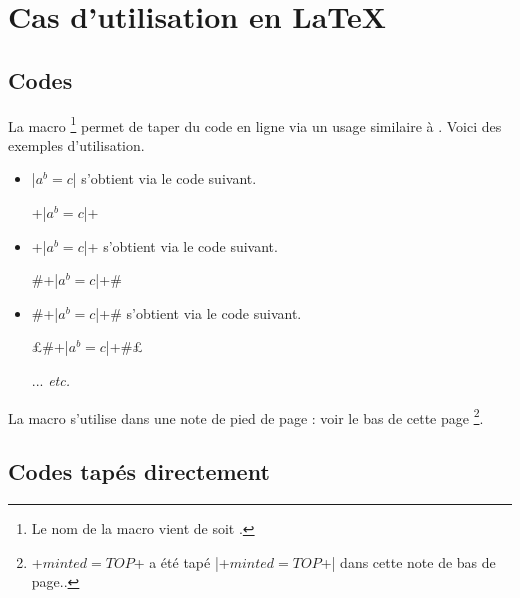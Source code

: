\documentclass[10pt, a4paper]{article}
\begin{document}
\section{Cas d'utilisation en \LaTeX}

\subsection{Codes } \label{bdoc-listing-inline}

La macro 
\footnote{
	Le nom de la macro  vient de  soit .
}
permet de taper du code en ligne via un usage similaire à .
Voici des exemples d'utilisation.
\begin{itemize}
    \item \bdocinlatex|$a^b = c$| s'obtient via le code suivant.
		  \begin{center}
		  		\bdocinlatex+\bdocinlatex|$a^b = c$|+
		  \end{center}


    \item \bdocinlatex+\bdocinlatex|$a^b = c$|+ s'obtient via le code suivant.
		  \begin{center}
		  		\bdocinlatex#\bdocinlatex+\bdocinlatex|$a^b = c$|+#
		  \end{center}
          

    \item \bdocinlatex#\bdocinlatex+\bdocinlatex|$a^b = c$|+# s'obtient via le code suivant.
		  \begin{center}
		  		\bdocinlatex£\bdocinlatex#\bdocinlatex+\bdocinlatex|$a^b = c$|+#£
				
				\medskip
				
				... \emph{etc.}
		  \end{center}
\end{itemize}


\begin{bdocimportant}
    La macro  s'utilise dans une note de pied de page : voir le bas de cette page
    \footnote{
        \bdocinlatex+$minted = TOP$+ a été tapé \bdocinlatex|\bdocinlatex+$minted = TOP$+| dans cette note de bas de page..
    }.
\end{bdocimportant}




\subsection{Codes tapés directement}
\end{document}
